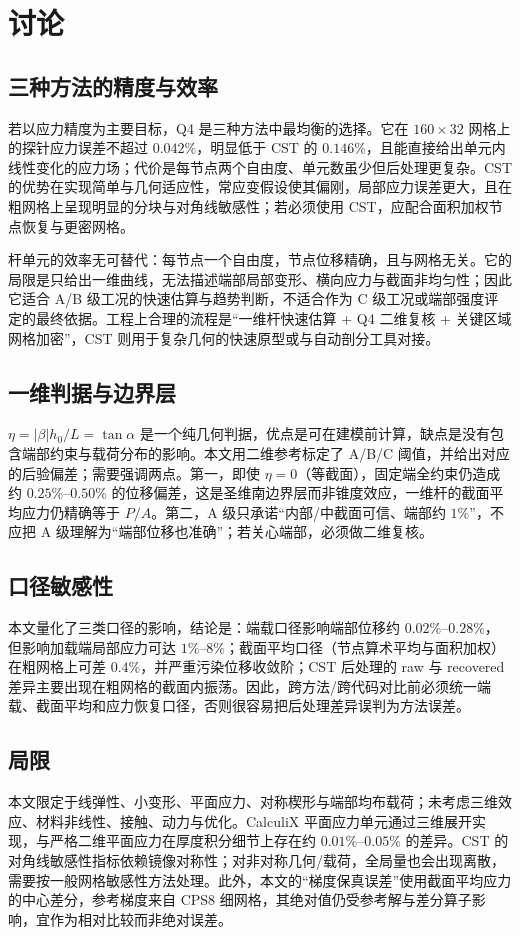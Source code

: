\section{讨论}

\subsection{三种方法的精度与效率}

若以应力精度为主要目标，Q4 是三种方法中最均衡的选择。它在 $160\times32$ 网格上的探针应力误差不超过 $0.042\%$，明显低于 CST 的 $0.146\%$，且能直接给出单元内线性变化的应力场；代价是每节点两个自由度、单元数虽少但后处理更复杂。CST 的优势在实现简单与几何适应性，常应变假设使其偏刚，局部应力误差更大，且在粗网格上呈现明显的分块与对角线敏感性；若必须使用 CST，应配合面积加权节点恢复与更密网格。

杆单元的效率无可替代：每节点一个自由度，节点位移精确，且与网格无关。它的局限是只给出一维曲线，无法描述端部局部变形、横向应力与截面非均匀性；因此它适合 A/B 级工况的快速估算与趋势判断，不适合作为 C 级工况或端部强度评定的最终依据。工程上合理的流程是“一维杆快速估算 + Q4 二维复核 + 关键区域网格加密”，CST 则用于复杂几何的快速原型或与自动剖分工具对接。

\subsection{一维判据与边界层}

$\eta=|\beta|h_0/L=\tan\alpha$ 是一个纯几何判据，优点是可在建模前计算，缺点是没有包含端部约束与载荷分布的影响。本文用二维参考标定了 A/B/C 阈值，并给出对应的后验偏差；需要强调两点。第一，即使 $\eta=0$（等截面），固定端全约束仍造成约 $0.25\%$–$0.50\%$ 的位移偏差，这是圣维南边界层而非锥度效应，一维杆的截面平均应力仍精确等于 $P/A$。第二，A 级只承诺“内部/中截面可信、端部约 $1\%$”，不应把 A 级理解为“端部位移也准确”；若关心端部，必须做二维复核。

\subsection{口径敏感性}

本文量化了三类口径的影响，结论是：端载口径影响端部位移约 $0.02\%$–$0.28\%$，但影响加载端局部应力可达 $1\%$–$8\%$；截面平均口径（节点算术平均与面积加权）在粗网格上可差 $0.4\%$，并严重污染位移收敛阶；CST 后处理的 raw 与 recovered 差异主要出现在粗网格的截面内振荡。因此，跨方法/跨代码对比前必须统一端载、截面平均和应力恢复口径，否则很容易把后处理差异误判为方法误差。

\subsection{局限}

本文限定于线弹性、小变形、平面应力、对称楔形与端部均布载荷；未考虑三维效应、材料非线性、接触、动力与优化。CalculiX 平面应力单元通过三维展开实现，与严格二维平面应力在厚度积分细节上存在约 $0.01\%$–$0.05\%$ 的差异。CST 的对角线敏感性指标依赖镜像对称性；对非对称几何/载荷，全局量也会出现离散，需要按一般网格敏感性方法处理。此外，本文的“梯度保真误差”使用截面平均应力的中心差分，参考梯度来自 CPS8 细网格，其绝对值仍受参考解与差分算子影响，宜作为相对比较而非绝对误差。
